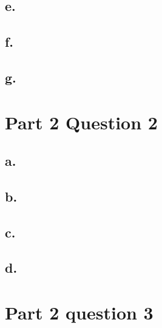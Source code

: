 \documentclass{article}
\newcommand{\xxx}[1]{\textcolor{red}{#1}}
\theoremstyle{plain}
\theoremstyle{definition}
\theoremstyle{remark}
\begin{document}
\subsection*{e.}

\subsection*{f.}

\subsection*{g.}

\section{Part 2 Question 2}

\subsection*{a.}

\subsection*{b.}

\subsection*{c.}

\subsection*{d.}

\section{Part 2 question 3}
%
%
%
\newpage
\end{document}
